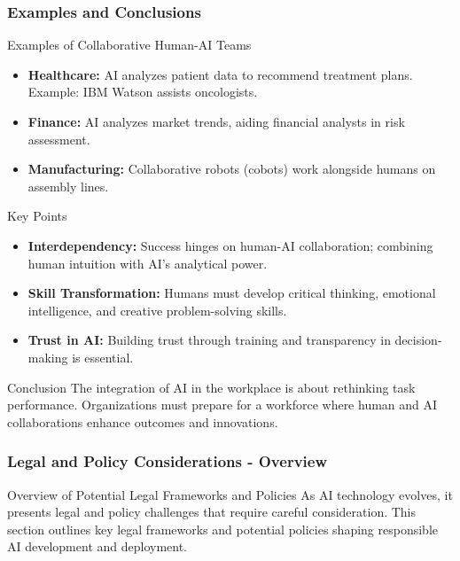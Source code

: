 \documentclass[aspectratio=169]{beamer}
\begin{document}
\begin{frame}[fragile]
    \frametitle{Examples and Conclusions}
    \begin{block}{Examples of Collaborative Human-AI Teams}
        \begin{itemize}
            \item \textbf{Healthcare:} AI analyzes patient data to recommend treatment plans. Example: IBM Watson assists oncologists.
            \item \textbf{Finance:} AI analyzes market trends, aiding financial analysts in risk assessment.
            \item \textbf{Manufacturing:} Collaborative robots (cobots) work alongside humans on assembly lines.
        \end{itemize}
    \end{block}

    \begin{block}{Key Points}
        \begin{itemize}
            \item \textbf{Interdependency:} Success hinges on human-AI collaboration; combining human intuition with AI's analytical power.
            \item \textbf{Skill Transformation:} Humans must develop critical thinking, emotional intelligence, and creative problem-solving skills.
            \item \textbf{Trust in AI:} Building trust through training and transparency in decision-making is essential.
        \end{itemize}
    \end{block}
    
    \begin{block}{Conclusion}
        The integration of AI in the workplace is about rethinking task performance. Organizations must prepare for a workforce where human and AI collaborations enhance outcomes and innovations.
    \end{block}
\end{frame}

\begin{frame}[fragile]
    \frametitle{Legal and Policy Considerations - Overview}
    \begin{block}{Overview of Potential Legal Frameworks and Policies}
        As AI technology evolves, it presents legal and policy challenges that require careful consideration. This section outlines key legal frameworks and potential policies shaping responsible AI development and deployment.
    \end{block}
\end{frame}
\end{document}
